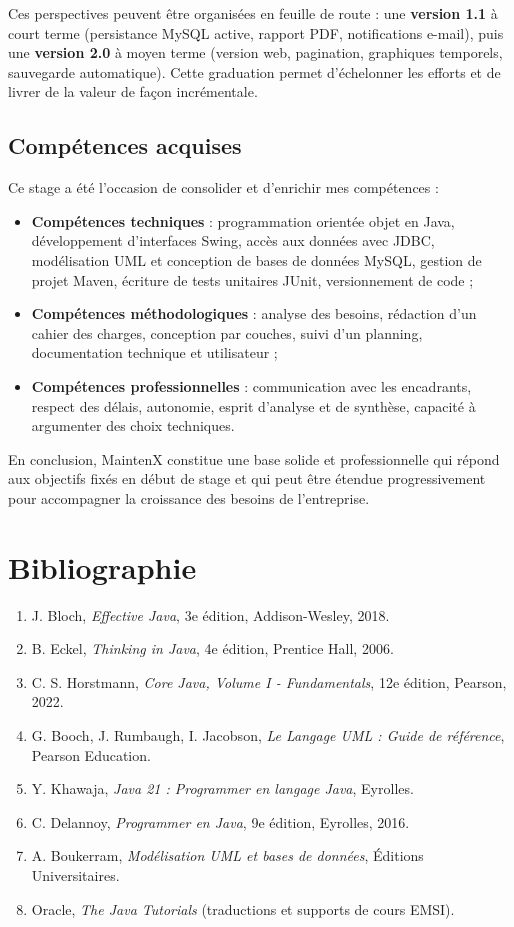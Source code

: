 \documentclass[11pt,a4paper]{report}
\begin{document}
Ces perspectives peuvent être organisées en feuille de route : une \textbf{version 1.1} à court terme (persistance MySQL active, rapport PDF, notifications e-mail), puis une \textbf{version 2.0} à moyen terme (version web, pagination, graphiques temporels, sauvegarde automatique). Cette graduation permet d'échelonner les efforts et de livrer de la valeur de façon incrémentale.
\section*{Compétences acquises}

Ce stage a été l'occasion de consolider et d'enrichir mes compétences :
\begin{itemize}
  \item \textbf{Compétences techniques} : programmation orientée objet en Java, développement d'interfaces Swing, accès aux données avec JDBC, modélisation UML et conception de bases de données MySQL, gestion de projet Maven, écriture de tests unitaires JUnit, versionnement de code ;
  \item \textbf{Compétences méthodologiques} : analyse des besoins, rédaction d'un cahier des charges, conception par couches, suivi d'un planning, documentation technique et utilisateur ;
  \item \textbf{Compétences professionnelles} : communication avec les encadrants, respect des délais, autonomie, esprit d'analyse et de synthèse, capacité à argumenter des choix techniques.
\end{itemize}

En conclusion, MaintenX constitue une base solide et professionnelle qui répond aux objectifs fixés en début de stage et qui peut être étendue progressivement pour accompagner la croissance des besoins de l'entreprise.
\chapter*{Bibliographie}
\begin{enumerate}
  \item J. Bloch, \textit{Effective Java}, 3e édition, Addison-Wesley, 2018.
  \item B. Eckel, \textit{Thinking in Java}, 4e édition, Prentice Hall, 2006.
  \item C. S. Horstmann, \textit{Core Java, Volume I - Fundamentals}, 12e édition, Pearson, 2022.
  \item G. Booch, J. Rumbaugh, I. Jacobson, \textit{Le Langage UML : Guide de référence}, Pearson Education.
  \item Y. Khawaja, \textit{Java 21 : Programmer en langage Java}, Eyrolles.
  \item C. Delannoy, \textit{Programmer en Java}, 9e édition, Eyrolles, 2016.
  \item A. Boukerram, \textit{Modélisation UML et bases de données}, Éditions Universitaires.
  \item Oracle, \textit{The Java Tutorials} (traductions et supports de cours EMSI).
\end{enumerate}
\end{document}
